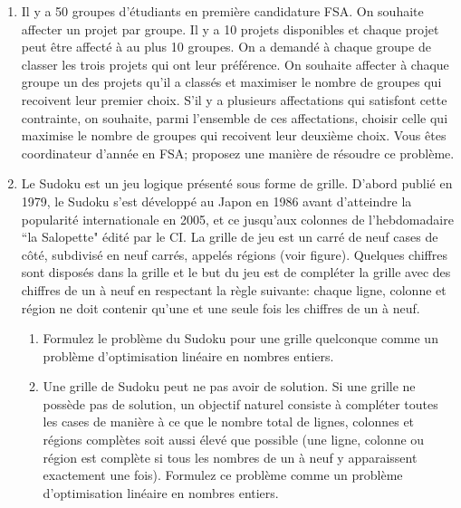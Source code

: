 \begin{enumerate}
  \item  Il y a 50 groupes d'étudiants en première candidature FSA. On souhaite affecter un projet par groupe. Il y a 10
    projets disponibles et chaque projet peut être affecté à au plus 10 groupes. On a demandé à chaque groupe de classer les trois projets qui ont leur
    préférence. On souhaite affecter à chaque groupe un des projets qu'il a classés et maximiser le nombre de groupes qui recoivent leur premier choix.
    S'il y a plusieurs affectations qui satisfont cette contrainte, on souhaite, parmi l'ensemble de ces affectations, choisir celle qui maximise le nombre de groupes
    qui recoivent leur deuxième choix. Vous êtes coordinateur d'année en FSA; proposez une manière de résoudre ce problème.


    \begin{solution}
      \nosolution
    \end{solution}

  \item Le Sudoku est un jeu logique présenté sous forme de grille.
    D'abord publié en 1979, le Sudoku s'est développé au Japon en 1986 avant d'atteindre la popularité internationale en 2005, et ce jusqu'aux colonnes de l'hebdomadaire ``la Salopette" édité par le CI.
    La grille de jeu est un carré de neuf cases de côté, subdivisé en neuf carrés, appelés régions (voir figure).
    Quelques chiffres sont disposés dans la grille et le but du jeu est de compléter la grille avec des chiffres  de un à neuf en respectant la règle suivante: chaque ligne, colonne et région ne doit contenir qu'une et une seule fois  les chiffres de un à neuf.

    \begin{enumerate}

      \item Formulez le problème du Sudoku pour une grille quelconque comme
        un problème  d'optimisation linéaire en nombres entiers.

      \item Une grille de Sudoku peut ne pas avoir de solution.
        Si une grille ne possède pas de solution,
        un objectif naturel consiste
        à compléter  toutes les cases de manière à ce que
        le nombre total de lignes,
        colonnes et régions complètes soit aussi élevé que possible
        (une ligne, colonne ou région est complète si tous les nombres de
        un à neuf y apparaissent exactement une fois).
        Formulez ce problème comme un problème d'optimisation linéaire
  en nombres entiers.


\end{enumerate}
\end{enumerate}
